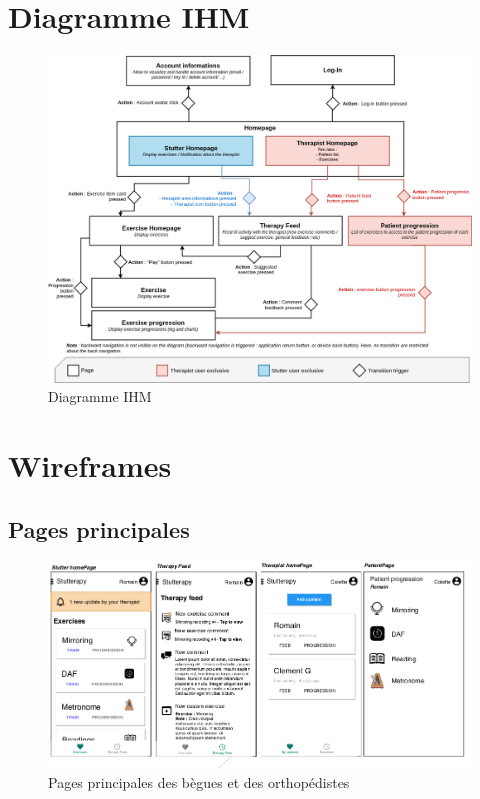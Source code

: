 \begin{appendices}
\chapter{Diagramme IHM}
\label{appendix:ihm}
\begin{figure}[H]
  \includegraphics[width=1\linewidth]{content/imgs/IHM_diagram.png}
  \caption*{Diagramme IHM}
\end{figure}


\chapter{Wireframes}
\label{appendix:wireframes}
\section{Pages principales}
\begin{figure}[H]
  \includegraphics[width=1\linewidth]{content/imgs/maquette1.png}
  \caption*{Pages principales des bègues et des orthopédistes}
\end{figure}


\end{appendices}
